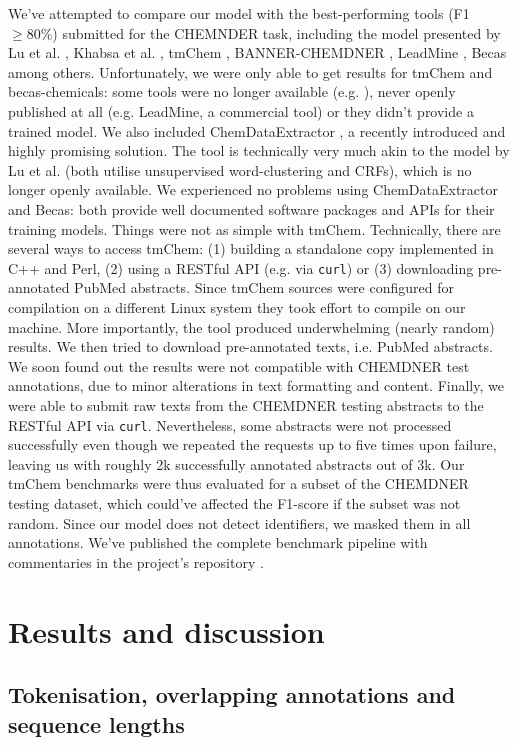 \documentclass[twocolumn]{bmcart}%
\begin{document}
We've attempted to compare our model with the best-performing tools (F1 $\geq 80\%$) submitted for the CHEMNDER task, including the model presented by Lu et al. \cite{Lu2015}, Khabsa et al. \cite{Khabsa2015}, tmChem \cite{Leaman2015}, BANNER-CHEMDNER \cite{Munkhdalai2015}, LeadMine \cite{Lowe2015}, Becas \cite{Campos} among others. 
Unfortunately, we were only able to get results for tmChem and becas-chemicals: some tools were no longer available (e.g. \cite{Lu2015}), never openly published at all (e.g. LeadMine, a commercial tool) or they didn't provide a trained model.
We also included ChemDataExtractor \cite{Swain2016}, a recently introduced and highly promising solution.
The tool is technically very much akin to the model by Lu et al. \cite{Lu2015} (both utilise unsupervised word-clustering and CRFs), which is no longer openly available.
We experienced no problems using ChemDataExtractor and Becas: both provide well documented software packages and APIs for their training models.
Things were not as simple with tmChem.
Technically, there are several ways to access tmChem: (1) building a standalone copy implemented in C++ and Perl, (2) using a RESTful API (e.g. via \verb|curl|) or (3) downloading pre-annotated PubMed abstracts.
Since tmChem sources were configured for compilation on a different Linux system they took effort to compile on our machine.
More importantly, the tool produced underwhelming (nearly random) results.
We then tried to download pre-annotated texts, i.e. PubMed abstracts. 
We soon found out the results were not compatible with CHEMDNER test annotations, due to minor alterations in text formatting and content.
Finally, we were able to submit raw texts from the CHEMDNER testing abstracts to the RESTful API via \verb|curl|.
Nevertheless, some abstracts were not processed successfully even though we repeated the requests up to five times upon failure, leaving us with roughly 2k successfully annotated abstracts out of 3k.
Our tmChem benchmarks were thus evaluated for a subset of the CHEMDNER testing dataset, which could've affected the F1-score if the subset was not random.
Since our model does not detect identifiers, we masked them in all annotations.
We've published the complete benchmark pipeline with commentaries in the project's repository \cite{GitHub}.

\section*{Results and discussion}

\subsection*{Tokenisation, overlapping annotations and sequence lengths}
\end{document}
